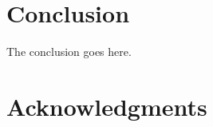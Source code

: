 \documentclass[conference,compsoc]{IEEEtran}
\begin{document}
%






\section{Conclusion}
The conclusion goes here.







\ifCLASSOPTIONcompsoc
  \section*{Acknowledgments}
\else
\end{document}
